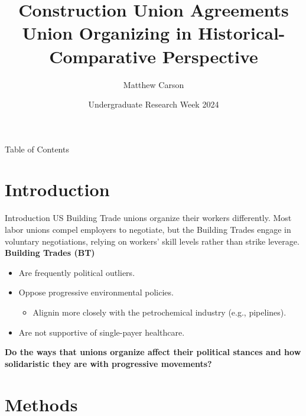 \documentclass{beamer}
\title[Construction Union\ldots{Historical-Comparative}]{Construction Union Agreements\\
Union Organizing in Historical-Comparative Perspective}
\author{Matthew Carson}
\date[Undergrad. Research Week '24]{Undergraduate Research Week 2024}
\begin{document}
\begin{frame}
  \titlepage
\end{frame}

\begin{frame}{Table of Contents}
  \begin{multicols}{2}
    \tableofcontents
  \end{multicols}
\end{frame}

\section{Introduction}
\begin{frame}{Introduction}
	US Building Trade unions organize their workers differently. Most labor unions compel employers to negotiate, but the Building Trades engage in voluntary negotiations, relying on workers' skill levels rather than strike leverage. 
	\newline\newline
	\textbf{Building Trades (BT)}
	\begin{itemize}
		\item Are frequently political outliers.
		\item Oppose progressive environmental policies.
		\begin{itemize}
			\item Alignin more closely with the petrochemical industry (e.g., pipelines).
		\end{itemize}
		\item Are not supportive of single-payer healthcare.
	\end{itemize}

\textbf{Do the ways that unions organize affect their political stances and how solidaristic they are with progressive movements?}
	
\end{frame}

\section{Methods}
\end{document}
